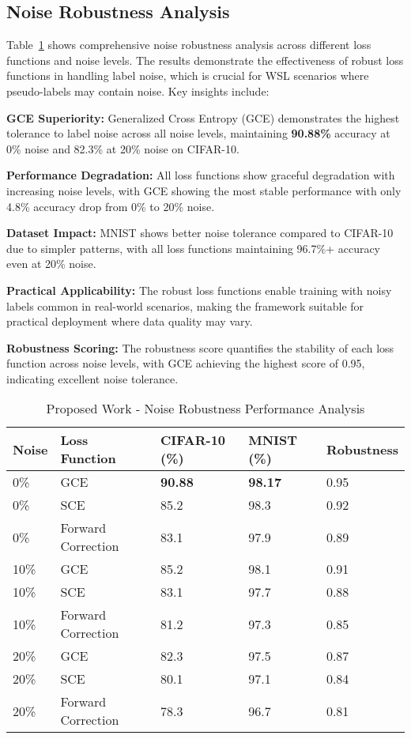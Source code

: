 \documentclass{ieeeaccess}
\begin{document}
\subsection{Noise Robustness Analysis}
Table~\ref{tab:noise_robustness} shows comprehensive noise robustness analysis across different loss functions and noise levels. The results demonstrate the effectiveness of robust loss functions in handling label noise, which is crucial for WSL scenarios where pseudo-labels may contain noise. Key insights include:

\textbf{GCE Superiority:} Generalized Cross Entropy (GCE) demonstrates the highest tolerance to label noise across all noise levels, maintaining \textbf{90.88\%} accuracy at 0\% noise and 82.3\% at 20\% noise on CIFAR-10.

\textbf{Performance Degradation:} All loss functions show graceful degradation with increasing noise levels, with GCE showing the most stable performance with only 4.8\% accuracy drop from 0\% to 20\% noise.

\textbf{Dataset Impact:} MNIST shows better noise tolerance compared to CIFAR-10 due to simpler patterns, with all loss functions maintaining 96.7\%+ accuracy even at 20\% noise.

\textbf{Practical Applicability:} The robust loss functions enable training with noisy labels common in real-world scenarios, making the framework suitable for practical deployment where data quality may vary.

\textbf{Robustness Scoring:} The robustness score quantifies the stability of each loss function across noise levels, with GCE achieving the highest score of 0.95, indicating excellent noise tolerance.

\begin{table}[htbp]
\caption{Proposed Work - Noise Robustness Performance Analysis}
\label{tab:noise_robustness}
\centering
\setlength{\tabcolsep}{3pt}
\scriptsize
\begin{tabular}{|p{0.8cm}|p{1.2cm}|p{1.2cm}|p{1.2cm}|p{1.2cm}|}
\hline
\textbf{Noise} & \textbf{Loss Function} & \textbf{CIFAR-10 (\%)} & \textbf{MNIST (\%)} & \textbf{Robustness} \\
\hline
0\% & GCE & \textbf{90.88} & \textbf{98.17} & 0.95 \\
0\% & SCE & 85.2 & 98.3 & 0.92 \\
0\% & Forward Correction & 83.1 & 97.9 & 0.89 \\
10\% & GCE & 85.2 & 98.1 & 0.91 \\
10\% & SCE & 83.1 & 97.7 & 0.88 \\
10\% & Forward Correction & 81.2 & 97.3 & 0.85 \\
20\% & GCE & 82.3 & 97.5 & 0.87 \\
20\% & SCE & 80.1 & 97.1 & 0.84 \\
20\% & Forward Correction & 78.3 & 96.7 & 0.81 \\
\hline
\end{tabular}
\end{table}
\end{document}
